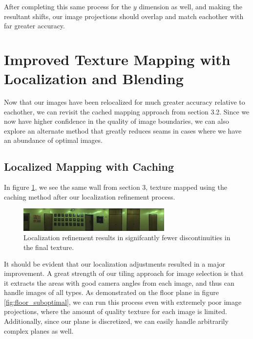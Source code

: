 \documentclass[10pt,twocolumn,letterpaper]{article}
\begin{document}
After completing this same process for the $y$ dimension as well, and
making the resultant shifts, our image projections should overlap and
match eachother with far greater accuracy.


\section{Improved Texture Mapping with Localization and Blending}
Now that our images have been relocalized for much greater accuracy
relative to eachother, we can revisit the cached mapping approach from
section 3.2. Since we now have higher confidence in the quality of
image boundaries, we can also explore an alternate method that greatly
reduces seams in cases where we have an abundance of optimal images.

\subsection{Localized Mapping with Caching}
In figure \ref{fig:shifted}, we see the same wall from section 3,
texture mapped using the caching method after our localization
refinement process.

\begin{figure}
  \centering
  \includegraphics[width=3in]{wall1_cache_full_shifted.jpg}
  \caption{Localization refinement results in signifcantly fewer
    discontinuities in the final texture.}
  \label{fig:shifted}
\end{figure}


It should be evident that our localization adjustments resulted in a
major improvement. A great strength of our tiling approach for image
selection is that it extracts the areas with good camera angles from
each image, and thus can handle images of all types. As demonstrated
on the floor plane in figure \ref{fig:floor_suboptimal}, we can run
this process even with extremely poor image projections, where the
amount of quality texture for each image is limited. Additionally,
since our plane is discretized, we can easily handle arbitrarily
complex planes as well.
\end{document}
